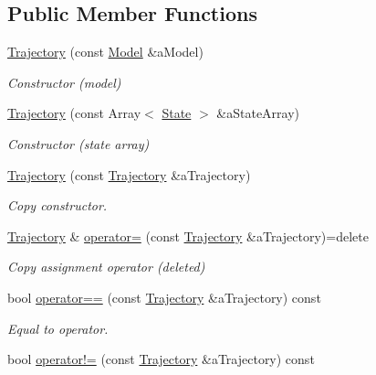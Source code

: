 \subsection*{Public Member Functions}
\begin{DoxyCompactItemize}
\item 
\hyperlink{classlibrary_1_1astro_1_1_trajectory_a8e5c7740915ca947e067c0f419ac1c65}{Trajectory} (const \hyperlink{classlibrary_1_1astro_1_1trajectory_1_1_model}{Model} \&a\+Model)
\begin{DoxyCompactList}\small\item\em Constructor (model) \end{DoxyCompactList}\item 
\hyperlink{classlibrary_1_1astro_1_1_trajectory_abe42247164ca6f966ae5f0c2dfa29182}{Trajectory} (const Array$<$ \hyperlink{classlibrary_1_1astro_1_1trajectory_1_1_state}{State} $>$ \&a\+State\+Array)
\begin{DoxyCompactList}\small\item\em Constructor (state array) \end{DoxyCompactList}\item 
\hyperlink{classlibrary_1_1astro_1_1_trajectory_a63aa2162979ed09fedded192871f0f0a}{Trajectory} (const \hyperlink{classlibrary_1_1astro_1_1_trajectory}{Trajectory} \&a\+Trajectory)
\begin{DoxyCompactList}\small\item\em Copy constructor. \end{DoxyCompactList}\item 
\hyperlink{classlibrary_1_1astro_1_1_trajectory}{Trajectory} \& \hyperlink{classlibrary_1_1astro_1_1_trajectory_abf8200a7b8e08ac9e0f26224fd26cd05}{operator=} (const \hyperlink{classlibrary_1_1astro_1_1_trajectory}{Trajectory} \&a\+Trajectory)=delete
\begin{DoxyCompactList}\small\item\em Copy assignment operator (deleted) \end{DoxyCompactList}\item 
bool \hyperlink{classlibrary_1_1astro_1_1_trajectory_a11bb251602a70c65e727dfc7ed49231e}{operator==} (const \hyperlink{classlibrary_1_1astro_1_1_trajectory}{Trajectory} \&a\+Trajectory) const
\begin{DoxyCompactList}\small\item\em Equal to operator. \end{DoxyCompactList}\item 
bool \hyperlink{classlibrary_1_1astro_1_1_trajectory_a3fa102c5193028fabe84aa7cee9b3e55}{operator!=} (const \hyperlink{classlibrary_1_1astro_1_1_trajectory}{Trajectory} \&a\+Trajectory) const

\end{DoxyCompactItemize}
